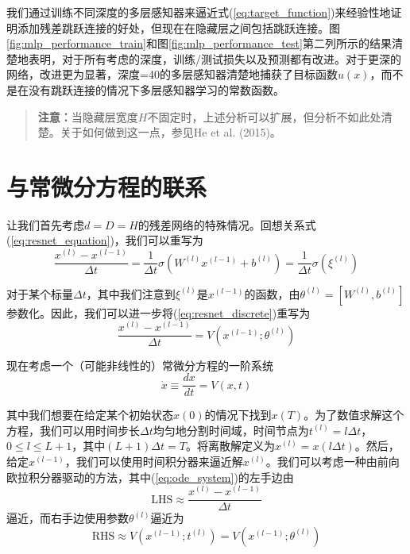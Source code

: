 我们通过训练不同深度的多层感知器来逼近式(\ref{eq:target_function})来经验性地证明添加残差跳跃连接的好处，但现在在隐藏层之间包括跳跃连接。图\ref{fig:mlp_performance_train}和图\ref{fig:mlp_performance_test}第二列所示的结果清楚地表明，对于所有考虑的深度，训练/测试损失以及预测都有改进。对于更深的网络，改进更为显著，深度=40的多层感知器清楚地捕获了目标函数$u(x)$，而不是在没有跳跃连接的情况下多层感知器学习的常数函数。

\begin{quote}
\textbf{注意：}当隐藏层宽度$H$不固定时，上述分析可以扩展，但分析不如此处清楚。关于如何做到这一点，参见He et al. (2015)。
\end{quote}

\section{与常微分方程的联系}
\label{sec:connections_odes}

让我们首先考虑$d = D = H$的残差网络的特殊情况。回想关系式(\ref{eq:resnet_equation})，我们可以重写为
\begin{equation}
\frac{x^{(l)} - x^{(l-1)}}{\Delta t} = \frac{1}{\Delta t} \sigma(W^{(l)} x^{(l-1)} + b^{(l)}) = \frac{1}{\Delta t} \sigma(\xi^{(l)})
\label{eq:resnet_discrete}
\end{equation}

对于某个标量$\Delta t$，其中我们注意到$\xi^{(l)}$是$x^{(l-1)}$的函数，由$\theta^{(l)} = [W^{(l)}, b^{(l)}]$参数化。因此，我们可以进一步将(\ref{eq:resnet_discrete})重写为
\begin{equation}
\frac{x^{(l)} - x^{(l-1)}}{\Delta t} = V(x^{(l-1)}; \theta^{(l)})
\label{eq:resnet_ode_form}
\end{equation}

现在考虑一个（可能非线性的）常微分方程的一阶系统
\begin{equation}
\dot{x} \equiv \frac{dx}{dt} = V(x, t)
\label{eq:ode_system}
\end{equation}

其中我们想要在给定某个初始状态$x(0)$的情况下找到$x(T)$。为了数值求解这个方程，我们可以用时间步长$\Delta t$均匀地分割时间域，时间节点为$t^{(l)} = l\Delta t$，$0 \leq l \leq L + 1$，其中$(L + 1)\Delta t = T$。将离散解定义为$x^{(l)} = x(l\Delta t)$。然后，给定$x^{(l-1)}$，我们可以使用时间积分器来逼近解$x^{(l)}$。我们可以考虑一种由前向欧拉积分器驱动的方法，其中(\ref{eq:ode_system})的左手边由
\begin{equation}
\text{LHS} \approx \frac{x^{(l)} - x^{(l-1)}}{\Delta t}
\end{equation}
逼近，而右手边使用参数$\theta^{(l)}$逼近为
\begin{equation}
\text{RHS} \approx V(x^{(l-1)}; t^{(l)}) = V(x^{(l-1)}; \theta^{(l)})
\end{equation}

